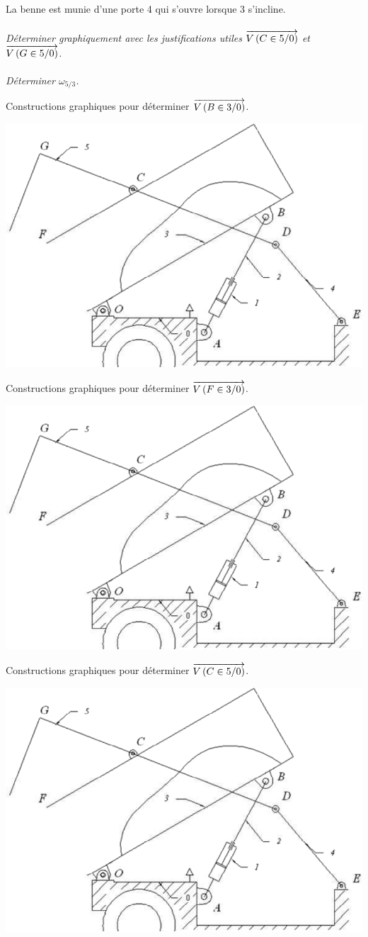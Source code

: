 \documentclass[11pt,oneside]{article}
\begin{document}
La benne est munie d'une porte 4 qui s'ouvre lorsque 3 s'incline.


\paragraph{}
\textit{Déterminer graphiquement avec les justifications utiles $\overrightarrow{V\left( {C} \in {5}/{0}\right)}$ et $\overrightarrow{V\left( {G} \in {5}/{0}\right)}$.}


\paragraph{}
\textit{Déterminer $\omega_{5/3}$.}

Constructions graphiques pour déterminer $\overrightarrow{V\left( {B} \in {3}/{0}\right)}$.
\begin{center}
\includegraphics[width=.7\textwidth]{png/fig5}
\end{center}


Constructions graphiques pour déterminer $\overrightarrow{V\left( {F} \in {3}/{0}\right)}$.
\begin{center}
\includegraphics[width=.7\textwidth]{png/fig5}
\end{center}


Constructions graphiques pour déterminer $\overrightarrow{V\left( {C} \in {5}/{0}\right)}$.
\begin{center}
\includegraphics[width=.7\textwidth]{png/fig5}
\end{center}
\end{document}
